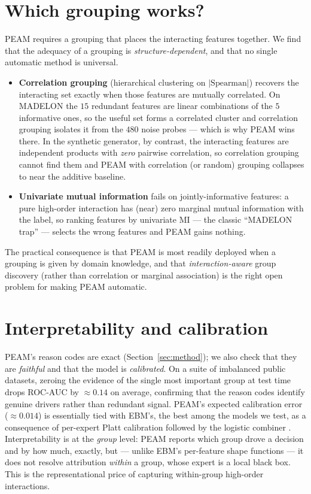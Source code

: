 \documentclass{article}
\begin{document}
\section{Which grouping works?}
\label{sec:grouping}

PEAM requires a grouping that places the interacting features together. We find
that the adequacy of a grouping is \emph{structure-dependent}, and that no single
automatic method is universal.
\begin{itemize}
\item \textbf{Correlation grouping} (hierarchical clustering on
$|\text{Spearman}|$) recovers the interacting set exactly when those features are
mutually correlated. On MADELON the $15$ redundant features are linear
combinations of the $5$ informative ones, so the useful set forms a correlated
cluster and correlation grouping isolates it from the $480$ noise probes --- which
is why PEAM wins there. In the synthetic generator, by contrast, the interacting
features are independent products with \emph{zero} pairwise correlation, so
correlation grouping cannot find them and PEAM with correlation (or random)
grouping collapses to near the additive baseline.
\item \textbf{Univariate mutual information} fails on jointly-informative
features: a pure high-order interaction has (near) zero marginal mutual
information with the label, so ranking features by univariate MI --- the classic
``MADELON trap'' --- selects the wrong features and PEAM gains nothing.
\end{itemize}
The practical consequence is that PEAM is most readily deployed when a grouping
is given by domain knowledge, and that \emph{interaction-aware} group discovery
(rather than correlation or marginal association) is the right open problem for
making PEAM automatic.

\section{Interpretability and calibration}
\label{sec:interp}

PEAM's reason codes are exact (Section~\ref{sec:method}); we also check that they
are \emph{faithful} and that the model is \emph{calibrated}. On a suite of
imbalanced public datasets, zeroing the evidence of the single most important
group at test time drops ROC-AUC by $\approx 0.14$ on average, confirming that
the reason codes identify genuine drivers rather than redundant signal. PEAM's
expected calibration error ($\approx 0.014$) is essentially tied with EBM's, the
best among the models we test, as a consequence of per-expert Platt calibration
followed by the logistic combiner \citep{platt1999calibration,guo2017calibration}.
Interpretability is at the \emph{group} level: PEAM reports which group drove a
decision and by how much, exactly, but --- unlike EBM's per-feature shape
functions --- it does not resolve attribution \emph{within} a group, whose expert
is a local black box. This is the representational price of capturing
within-group high-order interactions.
\end{document}

